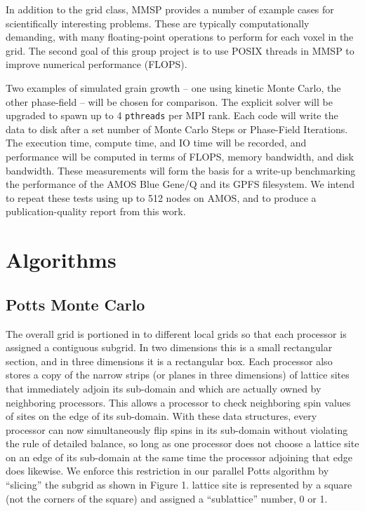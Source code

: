 \documentclass[11pt]{article}
\begin{document}
\begin{multicols}{2}
In addition to the grid class, MMSP provides a number of example cases for scientifically interesting problems.
These are typically computationally demanding, with many floating-point operations to perform for each voxel in the grid.
The second goal of this group project is to use POSIX threads in MMSP to improve numerical performance (FLOPS).

Two examples of simulated grain growth -- one using kinetic Monte Carlo, the other phase-field -- will be chosen for comparison.
The explicit solver will be upgraded to spawn up to 4 \texttt{pthreads} per MPI rank.
Each code will write the data to disk after a set number of Monte Carlo Steps or Phase-Field Iterations.
The execution time, compute time, and IO time will be recorded, and performance will be computed in terms of FLOPS, memory bandwidth, and disk bandwidth.
These measurements will form the basis for a write-up benchmarking the performance of the AMOS Blue Gene/Q and its GPFS filesystem.
We intend to repeat these tests using up to 512 nodes on AMOS, and to produce a publication-quality report from this work.

\section{Algorithms}

\subsection{Potts Monte Carlo}
The overall grid is portioned in to different local grids so that each processor is assigned a contiguous subgrid.
In two dimensions this is a small rectangular section, and in three dimensions it is a rectangular box.
Each processor also stores a copy of the narrow strips (or planes in three dimensions) of lattice sites that immediately adjoin its sub-domain and which are actually owned by neighboring processors.
This allows a processor to check neighboring spin values of sites on the edge of its sub-domain.
With these data structures, every processor can now simultaneously flip spins in its sub-domain without violating the rule of detailed balance, 
so long as one processor does not choose a lattice site on an edge of its sub-domain at the same time the processor adjoining that edge does likewise.
We enforce this restriction in our parallel Potts algorithm by ``slicing'' the subgrid as shown in Figure 1. 
lattice site is represented by a square (not the corners of the square) and assigned a ``sublattice'' number, 0 or 1.


\end{multicols}
\end{document}
